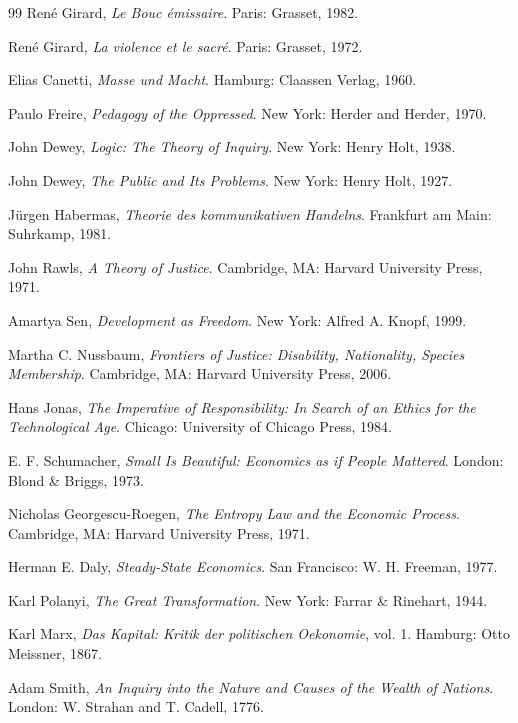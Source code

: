 \documentclass[11pt,oneside]{book}
\theoremstyle{definition}
\theoremstyle{remark}
\begin{document}
\begin{thebibliography}{99}
 Ren\'e Girard, \emph{Le Bouc \'emissaire}. Paris: Grasset, 1982.

 Ren\'e Girard, \emph{La violence et le sacr\'e}. Paris: Grasset, 1972.

 Elias Canetti, \emph{Masse und Macht}. Hamburg: Claassen Verlag, 1960.

 Paulo Freire, \emph{Pedagogy of the Oppressed}. New York: Herder and Herder, 1970.

 John Dewey, \emph{Logic: The Theory of Inquiry}. New York: Henry Holt, 1938.

 John Dewey, \emph{The Public and Its Problems}. New York: Henry Holt, 1927.

 J\"urgen Habermas, \emph{Theorie des kommunikativen Handelns}. Frankfurt am Main: Suhrkamp,
  1981.

 John Rawls, \emph{A Theory of Justice}. Cambridge, MA: Harvard University Press, 1971.

 Amartya Sen, \emph{Development as Freedom}. New York: Alfred A. Knopf, 1999.

 Martha C. Nussbaum, \emph{Frontiers of Justice: Disability, Nationality, Species Membership}.
  Cambridge, MA: Harvard University Press, 2006.

 Hans Jonas, \emph{The Imperative of Responsibility: In Search of an Ethics for the Technological
  Age}. Chicago: University of Chicago Press, 1984.

 E. F. Schumacher, \emph{Small Is Beautiful: Economics as if People Mattered}. London: Blond \&
  Briggs, 1973.

 Nicholas Georgescu-Roegen, \emph{The Entropy Law and the Economic Process}. Cambridge, MA:
  Harvard University Press, 1971.

 Herman E. Daly, \emph{Steady-State Economics}. San Francisco: W. H. Freeman, 1977.

 Karl Polanyi, \emph{The Great Transformation}. New York: Farrar \& Rinehart, 1944.

 Karl Marx, \emph{Das Kapital: Kritik der politischen Oekonomie}, vol. 1. Hamburg: Otto Meissner,
  1867.

 Adam Smith, \emph{An Inquiry into the Nature and Causes of the Wealth of Nations}. London: W.
  Strahan and T. Cadell, 1776.


\end{thebibliography}
\end{document}

